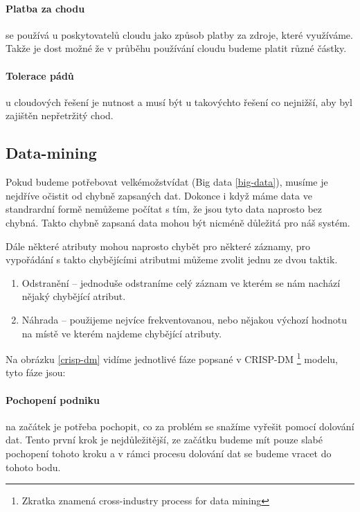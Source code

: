 \paragraph{Platba za chodu} se používá u poskytovatelů cloudu jako způsob platby za zdroje, které využíváme. Takže je dost možné že v průběhu používání cloudu budeme platit různé částky. \cite{big-data-dummies}

\paragraph{Tolerace pádů} u cloudových řešení je nutnost a musí být u takovýchto řešení co nejnižší, aby byl zajištěn nepřetržitý chod. \cite{big-data-dummies}

\subsection{Data-mining} \label{data-mining}
\par Pokud budeme potřebovat velkémožstvídat (Big data \ref{big-data}), musíme je nejdříve očistit od chybně zapsaných dat. Dokonce i když máme data ve standrardní formě nemůžeme počítat s tím, že jsou tyto data naprosto bez chybná. Takto chybně zapsaná data mohou být nicméně důležitá pro náš systém.\cite{data-mining-principles}

\par Dále některé atributy mohou naprosto chybět pro některé záznamy, pro vypořádání s takto chybějícími atributmi můžeme zvolit jednu ze dvou taktik. \cite{data-mining-principles}
\begin{enumerate}
  \item Odstranění -- jednoduše odstraníme celý záznam ve kterém se nám nachází nějaký chybějící atribut.
  \item Náhrada -- použijeme nejvíce frekventovanou, nebo nějakou výchozí hodnotu na místě ve kterém najdeme chybějící atributy. \cite{data-mining-principles}
\end{enumerate}

\par Na obrázku \ref{crisp-dm} vidíme jednotlivé fáze popsané v CRISP-DM \footnote{Zkratka znamená cross-industry process for data mining} modelu, tyto fáze jsou:
\paragraph{Pochopení podniku} na začátek je potřeba pochopit, co za problém se snažíme vyřešit pomocí dolování dat. Tento první krok je nejdůležitější, ze začátku budeme mít pouze slabé pochopení tohoto kroku a v rámci procesu dolování dat se budeme vracet do tohoto bodu. \cite{data-mining-practical}

